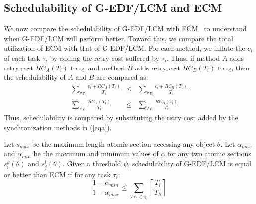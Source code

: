 \subsection{Schedulability of G-EDF/LCM and ECM}
\label{performance g-edf-lcm}
We now compare the schedulability of G-EDF/LCM with ECM~\cite{stmconcurrencycontrol:emsoft11} %
to understand when G-EDF/LCM will perform better. 
Toward this, we compare the total utilization of ECM with that of G-EDF/LCM. For each method, we inflate the $c_i$ of each task $\tau_i$ by adding the retry cost suffered by $\tau_i$. Thus, if method $A$ adds retry cost $RC_A(T_i)$ to $c_i$, and method $B$ adds retry cost $RC_B(T_i)$ to $c_i$, then the schedulability of $A$ and $B$ are compared as:
\begin{eqnarray}
\sum_{\forall \tau_{i}}\frac{c_{i}+RC_A(T_{i})}{T_{i}} & \le & \sum_{\forall \tau_{i}}\frac{c_{i}+RC_B(T_{i})}{T_{i}}\nonumber\\
\sum_{\forall \tau_{i}}\frac{RC_A(T_{i})}{T_{i}} & \le & \sum_{\forall \tau_{i}}\frac{RC_B(T_{i})}{T_{i}}
\label{eqa}\end{eqnarray}
Thus, schedulability is compared by substituting the retry cost added by the synchronization methods in (\ref{eqa}).

\begin{clm}\label{lcm versus ecm}
Let $s_{max}$ be the maximum length atomic section accessing any object $\theta$. Let $\alpha_{max}$ and $\alpha_{min}$ be the maximum and minimum values of $\alpha$ for any two atomic sections $s_i^k(\theta)$ and $s_j^l(\theta)$. Given a threshold $\psi$, schedulability of G-EDF/LCM is equal or better than ECM if for any task $\tau_i$:
\begin{equation}
\frac{1-\alpha_{min}}{1-\alpha_{max}} \le \sum_{\forall \tau_h \in \gamma_i}\left\lceil\frac{T_i}{T_h}\right\rceil
\label{edf-lcm-ecm}\end{equation}
\end{clm}

